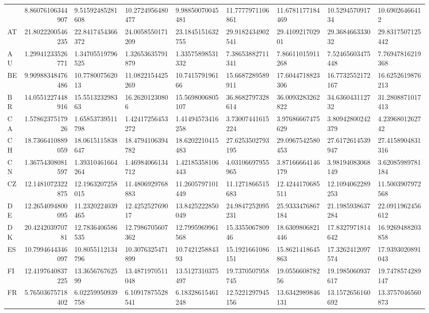 \documentclass[12pt,a4paper]{article}
\begin{document}
\begin{table}
\begin{threeparttable}
\begin{tabular}
  {AR} & 8.86076106344907 & 9.51592485281608 & 10.2724956480477 & 9.98850070045481 & 11.7777971106861 & 11.6781177184469 & 10.529457091734 & 10.69026466412 \\
{AT} & 21.8022200546235 & 22.8417454366372 & 24.0058550171209 & 23.1845151632755 & 29.9182434902541 & 29.410921702901 & 29.368466333032 & 29.8317507125442 \\
{AU} & 1.29941233526771 & 1.34705519796525 & 1.32653635791879 & 1.33575898531332 & 7.38653882711341 & 7.86611015911268 & 7.52465603475448 & 7.76947816219368 \\
{BE} & 9.90988348476486 & 10.778007562013 & 11.0822154425269 & 10.741579196166 & 15.6687289589911 & 17.6044718823306 & 16.7732552172167 & 16.6252619876213 \\
{BR} & 14.0551227448916 & 15.551323298363 & 16.26201230806 & 15.5698006805107 & 36.8682797328614 & 36.0093283262822 & 34.636043112732 & 31.2808871017413 \\
{CA} & 1.5786237517926 & 1.65853739511798 & 1.42417256453272 & 1.41494573416258 & 3.73007441615224 & 3.97686667475629 & 3.80942800242379 & 4.2396801262742 \\
{CH} & 18.7366410889059 & 18.0615115838647 & 18.4794106394782 & 18.6202210415483 & 27.6253502793195 & 29.0967542580453 & 27.6172614539947 & 27.4158904831316 \\
{CN} & 1.36754308081597 & 1.39310461664264 & 1.46984066134712 & 1.42185358106443 & 4.03106697955965 & 3.87166664146179 & 3.98194083068149 & 3.62085989781184 \\
{CZ} & 12.1481072322875 & 12.1963207258015 & 11.4806929768883 & 11.2605797101449 & 11.1271866515683 & 12.4244170685511 & 12.1094062289253 & 11.5003907972568 \\
{DE} & 12.2654094800095 & 11.2320224039465 & 12.425252769017 & 13.8425222850049 & 24.9847252095231 & 25.9333476867184 & 21.1985938637284 & 22.0911962456612 \\
{DK} & 20.424203970781 & 12.7836406586535 & 12.7986705607362 & 12.7995969961568 & 15.335506780946 & 18.6309806821446 & 17.8327971814642 & 16.9269488203858 \\
{ES} & 10.7994644346097 & 10.8055112134796 & 10.3076325471899 & 10.742125884393 & 15.1921661086151 & 15.8621418645863 & 17.3262412097574 & 17.9393020891043 \\
{FI} & 12.4197640837225 & 13.365676762599 & 13.4871970511048 & 13.5127310375497 & 19.7370507958745 & 19.055660878256 & 19.1985060937617 & 19.7478574289147 \\
{FR} & 5.76503675718402 & 6.02259950939758 & 6.10917875528541 & 6.18328615461248 & 12.5221297945156 & 13.6342989846131 & 13.1572656160692 & 13.3757046560873 \\

\end{tabular}
\end{threeparttable}
\end{table}
\end{document}
